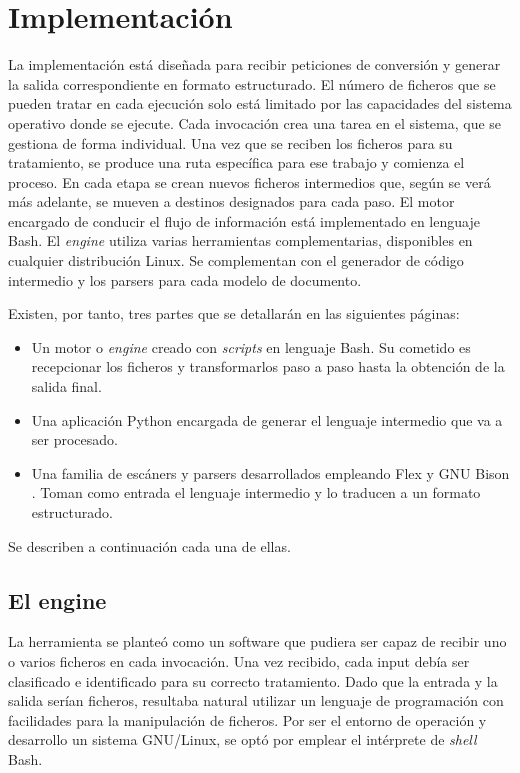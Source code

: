 
\chapter{Implementación}
\label{chap:implemetación}

La implementación está diseñada para recibir peticiones de conversión y generar la salida correspondiente en formato estructurado. El número de ficheros que se pueden tratar en cada ejecución solo está limitado por las capacidades del sistema operativo donde se ejecute. Cada invocación crea una tarea en el sistema, que se gestiona de forma individual. Una vez que se reciben los ficheros para su tratamiento, se produce una ruta específica para ese trabajo y comienza el proceso. En cada etapa se crean nuevos ficheros intermedios que, según se verá más adelante, se mueven a destinos designados para cada paso. El motor encargado de conducir el flujo de información está implementado en lenguaje Bash. El \emph{engine} utiliza varias herramientas complementarias, disponibles en cualquier distribución Linux. Se complementan con el generador de código intermedio y los parsers para cada modelo de documento.

Existen, por tanto, tres partes que se detallarán en las siguientes páginas:

\begin{itemize}
    \item Un motor o \emph{engine} creado con \emph{scripts} en lenguaje Bash. Su cometido es recepcionar los ficheros y transformarlos paso a paso hasta la obtención de la salida final.
    \item Una aplicación Python encargada de generar el lenguaje intermedio que va a ser procesado.
    \item Una familia de escáners y parsers desarrollados empleando Flex \cite{estes_flex_2021} y GNU Bison \cite{free_software_foundation_inc_bison_nodate}. Toman como entrada el lenguaje intermedio y lo traducen a un formato estructurado.
\end{itemize}

Se describen a continuación cada una de ellas.

\section{El engine}
La herramienta se planteó como un software que pudiera ser capaz de recibir uno o varios ficheros en cada invocación. Una vez recibido, cada input debía ser clasificado e identificado para su correcto tratamiento. Dado que la entrada y la salida serían ficheros, resultaba natural utilizar un lenguaje de programación con facilidades para la manipulación de ficheros. Por ser el entorno de operación y desarrollo un sistema GNU/Linux, se optó por emplear el intérprete de \emph{shell} Bash.

